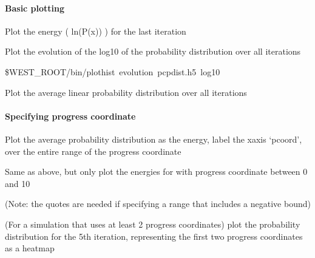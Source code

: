 \documentclass[letterpaper,10pt,english]{sphinxmanual}
\begin{document}
\paragraph{Basic plotting}
\label{\detokenize{users_guide/command_line_tools/plothist:basic-plotting}}
Plot the energy ( \sphinxhyphen{}ln(P(x)) ) for the last iteration


Plot the evolution of the log10 of the probability distribution over all
iterations

{\color{red}\bfseries{}\textasciigrave{}\textasciigrave{}}\$WEST\_ROOT/bin/plothist evolution pcpdist.h5 \textendash{}log10 \textasciigrave{}\textasciigrave{}

Plot the average linear probability distribution over all iterations



\paragraph{Specifying progress coordinate}
\label{\detokenize{users_guide/command_line_tools/plothist:specifying-progress-coordinate}}
Plot the average probability distribution as the energy, label the
x\sphinxhyphen{}axis ‘pcoord’, over the entire range of the progress coordinate


Same as above, but only plot the energies for with progress coordinate
between 0 and 10


(Note: the quotes are needed if specifying a range that includes a
negative bound)

(For a simulation that uses at least 2 progress coordinates) plot the
probability distribution for the 5th iteration, representing the first
two progress coordinates as a heatmap

\end{document}
